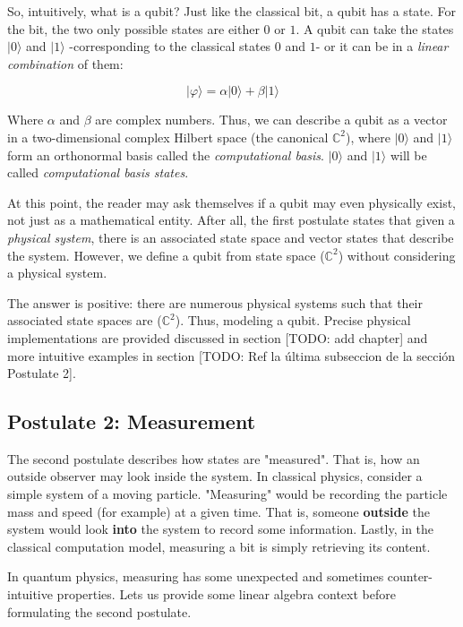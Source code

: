 \documentclass{article}
\begin{document}
	So, intuitively, what is a qubit? Just like the classical bit, a qubit has a state. For the bit, the two only possible states are either $0$ or $1$. A qubit can take the states $|0\rangle$ and $|1\rangle$ -corresponding to the classical states $0$ and $1$- or it can be in a \emph{linear combination} of them:
	
	$$ |\varphi\rangle = \alpha |0\rangle + \beta |1\rangle $$
	
	Where $\alpha$ and $\beta$ are complex numbers. Thus, we can describe a qubit as a vector in a two-dimensional complex Hilbert space (the canonical $\mathds{C}^{2}$), where $|0\rangle$ and $|1\rangle$ form an orthonormal basis called the \emph{computational basis}. $|0\rangle$ and $|1\rangle$ will be called \emph{computational basis states}.
	
	At this point, the reader may ask themselves if a qubit may even physically exist, not just as a mathematical entity. After all, the first postulate states that given a \emph{physical system}, there is an associated state space and vector states that describe the system. However, we define a qubit from state space ($\mathds{C}^{2}$) without considering a physical system. 
	
	The answer is positive: there are numerous physical systems such that their associated state spaces are ($\mathds{C}^{2}$). Thus, modeling a qubit. Precise physical implementations are provided discussed in section [TODO: add chapter] and more intuitive examples in section [TODO: Ref la última subseccion de la sección Postulate 2].
	
	
	\subsection{Postulate 2: Measurement}
	
	
	The second postulate describes how states are "measured". That is, how an outside observer may look inside the system. In classical physics, consider a simple system of a moving particle. "Measuring" would be recording the particle mass and speed (for example) at a given time. That is, someone \textbf{outside} the system would look \textbf{into} the system to record some information. Lastly, in the classical computation model, measuring a bit is simply retrieving its content.
	
	In quantum physics, measuring has some unexpected and sometimes counter-intuitive properties. Lets us provide some linear algebra context before formulating the second postulate.
	
\end{document}
